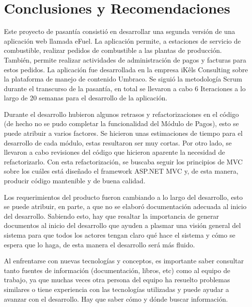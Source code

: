 \chapter*{Conclusiones y Recomendaciones}
Este proyecto de pasantía consistió en desarrollar una segunda versión de una aplicación web llamada eFuel. La aplicación permite, a estaciones de servicio de combustible, realizar pedidos de combustible a las plantas de producción. También, permite realizar actividades de administración de pagos y facturas para estos pedidos. La aplicación fue desarrollada en la empresa iKêls Consulting sobre la plataforma de manejo de contenido Umbraco. Se siguió la metodología Scrum durante el transcurso de la pasantía, en total se llevaron a cabo 6 Iteraciones a lo largo de 20 semanas para el desarrollo de la aplicación.

Durante el desarrollo hubieron algunos retrasos y refactorizaciones en el código (de hecho no se pudo completar la funcionalidad del Módulo de Pagos), esto se puede atribuir a varios factores. Se hicieron unas estimaciones de tiempo para el desarrollo de cada módulo, estas resultaron ser muy cortas. Por otro lado, se llevaron a cabo revisiones del código que hicieron aparente la necesidad de refactorizarlo. Con esta refactorización, se buscaba seguir los principios de MVC sobre los cuáles está diseñado el framework ASP.NET MVC y, de esta manera, producir código mantenible y de buena calidad. 

Los requerimientos del producto fueron cambiando a lo largo del desarrollo, esto se puede atribuir, en parte, a que no se elaboró documentación adecuada al inicio del desarrollo. Sabiendo esto, hay que resaltar la importancia de generar documentos al inicio del desarrollo que ayuden a plasmar una visión general del sistema para que todos los actores tengan claro qué hace el sistema y cómo se espera que lo haga, de esta manera el desarrollo será más fluido. 

Al enfrentarse con nuevas tecnologías y conceptos, es importante saber consultar tanto fuentes de información (documentación, libros, etc) como al equipo de trabajo, ya que muchas veces otra persona del equipo ha resuelto problemas similares o tiene experiencia con las tecnologías utilizadas y puede ayudar a avanzar con el desarrollo. Hay que saber cómo y dónde buscar información.

